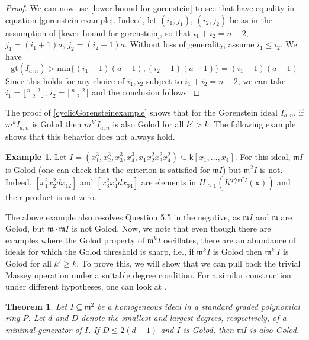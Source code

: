 \documentclass[10pt,reqno]{amsart}
\newtheorem{theorem}[subsection]{Theorem}
\theoremstyle{definition}
\newtheorem{example}[subsection]{Example}
\theoremstyle{remark}
\numberwithin{equation}{section}
\newcommand{\kk}{\mathsf k}
\newcommand{\m}{\mathfrak m}
\numberwithin{equation}{section}
\begin{document}
\begin{proof}
 We can now use \cref{lower bound for gorenstein} to see that have equality in equation \cref{gorenstein example}.
Indeed, let $(i_1, j_1)$, $(i_2, j_2)$ be as in the assumption of \cref{lower bound for gorenstein}, so that $i_1+i_2=n-2$, $j_1=(i_1+1)a$, $j_2=(i_2+1)a$. Without loss of generality, assume $i_1\le i_2$. We have
$$
\mathrm{gt}(I_{a, n})>\mathrm{min}\{(i_1-1)(a-1), (i_2-1)(a-1)\}=(i_1-1)(a-1)
$$
Since this holds for any choice of $i_1, i_2$ subject to $i_1+i_2=n-2$, we can take $i_1=\lfloor \frac{n-2}{2}\rfloor$, $i_2=\lceil \frac{n-2}{2}\rceil$ and the conclusion follows.
\end{proof}

The proof of \cref{cyclicGorensteinexample} shows that for the Gorenstein ideal $I_{a,n}$, if $m^kI_{a,n}$ is Golod then $m^{k'}I_{a,n}$ is also Golod for all $k'>k$. The following example shows that this behavior does not always hold.

\begin{example}
    Let $I=(x_1^3, x_2^3, x_3^3,x_4^3, x_1x_2^2x_3^2x_4^2)\subseteq \kk[x_1, \ldots, x_4]$. For this ideal, $\m I$ is Golod (one can check that the criterion \cite[Theorem 1.5]{zoromski2024monomial} is satisfied for $\m I$) but $\m^2I$ is not.  Indeed,    $[x_1^2x_2^2dx_{12}]$ and $[x_3^2x_4^2dx_{34}]$ are elements in $H_{\ge 1}(K^{P/\m^2I}(\mathbf x))$
    and their product is not zero. 
\end{example}

The above example also resolves Question 5.5 \cite{de2016products} in the negative, as $\m I $ and $\m$ are Golod, but $\m\cdot \m I$ is not Golod. Now, we note that even though there are examples where the Golod property of $\m^k I$ oscillates, there are an abundance of ideals for which the Golod threshold is sharp, i.e., if $\m^kI$ is Golod then $\m^{k'}I$ is Golod for all $k'\geq k$. To prove this, we will show that we can pull back the trivial Massey operation under a suitable degree condition. For a similar construction under different hypotheses, one can look at \cite{vandebogert2022detecting}.
 
 \begin{theorem}\label{equigenratedgolodThreshold}
     Let $I \subseteq \m^2$ be a homogeneous ideal in a standard graded polynomial ring $P$. Let $d$ and $D$ denote the smallest and largest degrees, respectively, of a minimal generator of $I$. If $D\leq 2(d-1)$ and $I$ is Golod, then $\m I$ is also Golod. 
 \end{theorem}
 
\end{document}
